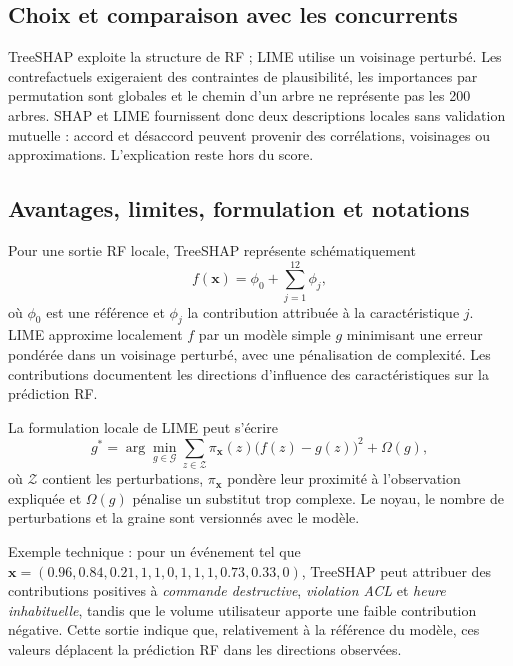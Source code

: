\documentclass[11pt,a4paper,oneside]{report}
\theoremstyle{definition}
\theoremstyle{plain}
\begin{document}
\subsection*{Choix et comparaison avec les concurrents}

TreeSHAP exploite la structure de RF ; LIME utilise un voisinage perturbé. Les contrefactuels exigeraient des contraintes de plausibilité, les importances par permutation sont globales et le chemin d'un arbre ne représente pas les 200 arbres. SHAP et LIME fournissent donc deux descriptions locales sans validation mutuelle : accord et désaccord peuvent provenir des corrélations, voisinages ou approximations. L'explication reste hors du score.

\subsection*{Avantages, limites, formulation et notations}

Pour une sortie RF locale, TreeSHAP représente schématiquement
\begin{equation}
f(\mathbf{x})=\phi_0+\sum_{j=1}^{12}\phi_j,
\label{eq:ai-ro-shap}
\end{equation}
où $\phi_0$ est une référence et $\phi_j$ la contribution attribuée à la
caractéristique $j$. LIME approxime localement $f$ par un modèle simple $g$
minimisant une erreur pondérée dans un voisinage perturbé, avec une pénalisation
de complexité. Les contributions documentent les directions d'influence des
caractéristiques sur la prédiction RF.

La formulation locale de LIME peut s'écrire
\begin{equation}
g^*=\arg\min_{g\in\mathcal{G}}
\sum_{z\in\mathcal{Z}}\pi_{\mathbf{x}}(z)
\bigl(f(z)-g(z)\bigr)^2+\Omega(g),
\label{eq:ai-ro-lime}
\end{equation}
où $\mathcal{Z}$ contient les perturbations, $\pi_{\mathbf{x}}$ pondère leur
proximité à l'observation expliquée et $\Omega(g)$ pénalise un substitut trop
complexe. Le noyau, le nombre de perturbations et la graine sont versionnés
avec le modèle.

Exemple technique : pour un événement tel que
$\mathbf{x}=(0.96,0.84,0.21,1,1,0,1,1,1,0.73,0.33,0)$, TreeSHAP peut attribuer des
contributions positives à \emph{commande destructive}, \emph{violation ACL} et
\emph{heure inhabituelle}, tandis que le volume utilisateur apporte une faible
contribution négative. Cette sortie indique que, relativement à la référence du
modèle, ces valeurs déplacent la prédiction RF dans les directions observées.
\end{document}
